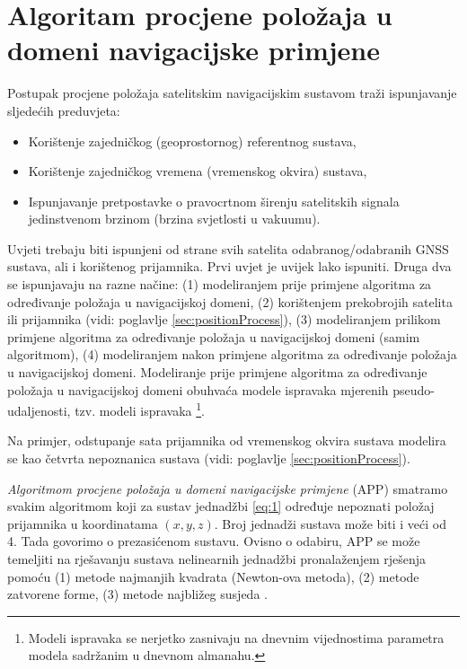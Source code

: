 \documentclass[a4paper,twoside,12pt]{memoir} %
\begin{document}
\chapter[Algoritam procjene položaja (APP)]{Algoritam procjene položaja u domeni navigacijske primjene}\label{sec:algoritam}
Postupak procjene položaja satelitskim navigacijskim sustavom traži ispunjavanje sljedećih preduvjeta:
\begin{itemize}
	\item Korištenje zajedničkog (geoprostornog) referentnog sustava,
	\item Korištenje zajedničkog vremena (vremenskog okvira) sustava,
	\item Ispunjavanje pretpostavke o pravocrtnom širenju satelitskih signala jedinstvenom
	brzinom (brzina svjetlosti u vakuumu).
\end{itemize}
Uvjeti trebaju biti ispunjeni od strane svih satelita odabranog/odabranih GNSS sustava, ali i korištenog prijamnika.
Prvi uvjet je uvijek lako ispuniti. Druga dva se ispunjavaju na razne načine:
(1) modeliranjem prije primjene algoritma za određivanje položaja u navigacijskoj domeni, (2)
korištenjem prekobrojih satelita ili prijamnika (vidi: poglavlje \ref{sec:positionProcess}), (3) modeliranjem prilikom primjene algoritma za određivanje položaja u navigacijskoj domeni (samim algoritmom), (4) modeliranjem nakon primjene algoritma za određivanje položaja u navigacijskoj domeni.
Modeliranje prije primjene algoritma za određivanje položaja u navigacijskoj domeni obuhvaća modele ispravaka mjerenih pseudo-udaljenosti, tzv. modeli ispravaka \footnote{Modeli ispravaka se nerjetko zasnivaju na dnevnim vijednostima parametra modela sadržanim u dnevnom almanahu.}.

Na primjer, odstupanje sata prijamnika od vremenskog okvira sustava modelira se kao četvrta nepoznanica sustava 
(vidi: poglavlje \ref{sec:positionProcess}).

\textit{Algoritmom procjene položaja u domeni navigacijske primjene} (APP)
smatramo svakim algoritmom koji za sustav jednadžbi \ref{eq:1}
određuje nepoznati položaj prijamnika u koordinatama $(x,y,z)$.
Broj jednadži sustava može biti i veći od 4. Tada govorimo o prezasićenom sustavu.
Ovisno o odabiru, APP se može temeljiti na rješavanju sustava nelinearnih jednadžbi pronalaženjem rješenja pomoću (1) metode najmanjih kvadrata (Newton-ova metoda),
(2) metode zatvorene forme, (3) metode najbližeg susjeda \cite{math:positioning}. 
\end{document}
